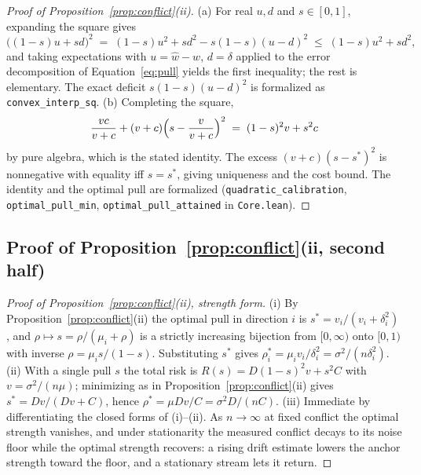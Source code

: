 \begin{proof}[Proof of Proposition~\ref{prop:conflict}(ii)]
(a) For real $u, d$ and $s \in [0,1]$, expanding the square gives
\[
  \bigl((1-s)u + s d\bigr)^2
  \;=\; (1-s)u^2 + s d^2 - s(1-s)(u - d)^2
  \;\le\; (1-s)u^2 + s d^2 ,
\]
and taking expectations with $u = \widehat w - w$, $d = \delta$ applied to the error decomposition of Equation~\eqref{eq:pull} yields the first inequality; the rest is elementary.
The exact deficit $s(1-s)(u-d)^2$ is formalized as \texttt{convex\_interp\_sq}.
(b) Completing the square,
\[
  \frac{vc}{v+c} + (v+c)\Bigl(s - \frac{v}{v+c}\Bigr)^{2}
  \;=\; (1-s)^2 v + s^2 c
\]
by pure algebra, which is the stated identity.
The excess $(v+c)(s - s^*)^2$ is nonnegative with equality iff $s = s^*$, giving uniqueness and the cost bound.
The identity and the optimal pull are formalized (\texttt{quadratic\_calibration}, \texttt{optimal\_pull\_min}, \texttt{optimal\_pull\_attained} in \texttt{Core.lean}).
\end{proof}

\subsection{Proof of Proposition~\ref{prop:conflict}(ii, second half)}
\label{app:proof-sign}



\begin{proof}[Proof of Proposition~\ref{prop:conflict}(ii), strength form]
(i) By Proposition~\ref{prop:conflict}(ii) the optimal pull in direction $i$ is $s^* = v_i/(v_i + \delta_i^2)$, and $\rho \mapsto s = \rho/(\mu_i + \rho)$ is a strictly increasing bijection from $[0,\infty)$ onto $[0,1)$ with inverse $\rho = \mu_i s/(1-s)$.
Substituting $s^*$ gives $\rho^*_i = \mu_i v_i/\delta_i^2 = \sigma^2/(n\delta_i^2)$.
(ii) With a single pull $s$ the total risk is $R(s) = D(1-s)^2 v + s^2 C$ with $v = \sigma^2/(n\mu)$; minimizing as in Proposition~\ref{prop:conflict}(ii) gives $s^* = Dv/(Dv + C)$, hence $\rho^* = \mu D v/C = \sigma^2 D/(nC)$.
(iii) Immediate by differentiating the closed forms of (i)--(ii).
As $n \to \infty$ at fixed conflict the optimal strength vanishes, and under stationarity the measured conflict decays to its noise floor while the optimal strength recovers: a rising drift estimate lowers the anchor strength toward the floor, and a stationary stream lets it return.
\end{proof}

